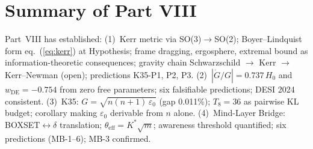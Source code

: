 \documentclass[12pt, a4paper]{article}
\begin{document}
\section{Summary of Part VIII}

Part~VIII has established: (1)~Kerr metric via SO(3)$\to$SO(2); Boyer--Lindquist
form eq.~(\ref{eq:kerr}) at Hypothesis; frame dragging, ergosphere, extremal bound
as information-theoretic consequences; gravity chain Schwarzschild $\to$ Kerr $\to$
Kerr--Newman (open); predictions K35-P1, P2, P3.
(2)~$|\dot{G}/G| = 0.737\,H_0$ and $w_{\mathrm{DE}} = -0.754$ from zero free parameters;
six falsifiable predictions; DESI 2024 consistent.
(3)~K35: $G=\sqrt{n(n+1)\,\varepsilon_0}$ (gap 0.011\%); $T_8=36$ as pairwise KL budget;
corollary making $\varepsilon_0$ derivable from $n$ alone.
(4)~Mind-Layer Bridge: BOXSET$\leftrightarrow\delta$ translation; $\theta_{\mathrm{eff}}=K^*\sqrt{m}$;
awareness threshold quantified; six predictions (MB-1--6); MB-3 confirmed.

\end{document}

